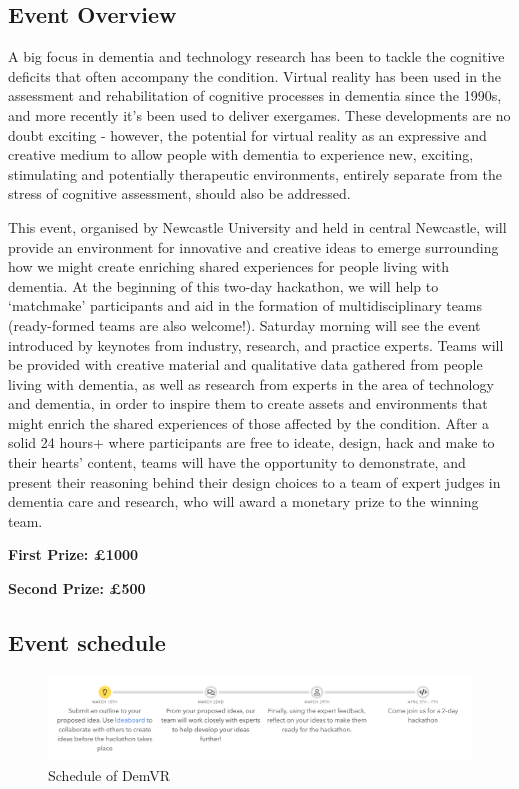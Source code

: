 \subsection{Event Overview}
\label{app:DemVR:Overview}
A big focus in dementia and technology research has been to tackle the cognitive deficits that often accompany the condition. Virtual reality has been used in the assessment and rehabilitation of cognitive processes in dementia since the 1990s, and more recently it's been used to deliver exergames. These developments are no doubt exciting - however, the potential for virtual reality as an expressive and creative medium to allow people with dementia to experience new, exciting, stimulating and potentially therapeutic environments, entirely separate from the stress of cognitive assessment, should also be addressed.

This event, organised by Newcastle University and held in central Newcastle, will provide an environment for innovative and creative ideas to emerge surrounding how we might create enriching shared experiences for people living with dementia. At the beginning of this two-day hackathon, we will help to `matchmake' participants and aid in the formation of multidisciplinary teams (ready-formed teams are also welcome!). Saturday morning will see the event introduced by keynotes from industry, research, and practice experts. Teams will be provided with creative material and qualitative data gathered from people living with dementia, as well as research from experts in the area of technology and dementia, in order to inspire them to create assets and environments that might enrich the shared experiences of those affected by the condition. After a solid 24 hours+ where participants are free to ideate, design, hack and make to their hearts' content, teams will have the opportunity to demonstrate, and present their reasoning behind their design choices to a team of expert judges in dementia care and research, who will award a monetary prize to the winning team.   

\textbf{First Prize: £1000}

\textbf{Second Prize: £500}



\subsection{Event schedule}
\label{app:DemVR:EventSchedule}
\begin{figure}[htp]
    \centering
    \includegraphics[width=0.8\linewidth]{Images/Appendix/DemVR appendix/Schedule.png}
    \caption{Schedule of DemVR}
    \label{fig:App:DemVRSchedule}
\end{figure}

